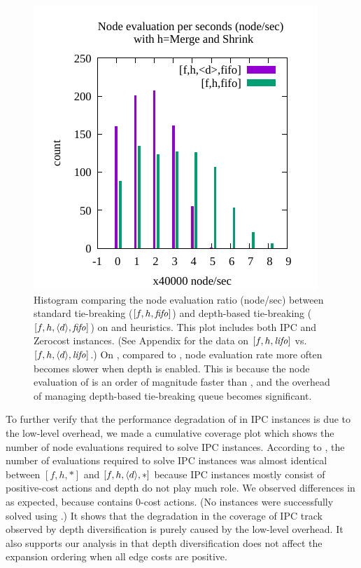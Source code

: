 \begin{figure}[htbp]
 \includegraphics{img/node-sec/mnhiF-mnh_F-hist.pdf}
 \caption{Histogram comparing the node evaluation ratio (node/sec) between standard tie-breaking ($[f,h,{\text{\textit{fifo}}}]$) and
 depth-based tie-breaking ($[f,h,{\left<d\right>},{\text{\textit{fifo}}}]$) on \lmcut and \mands heuristics.
 This plot includes both IPC and Zerocost instances.
 (See Appendix  for the data on $[f,h,{\text{\textit{lifo}}}]$ vs. $[f,h,{\left<d\right>},{\text{\textit{lifo}}}]$.)
 On \mands, compared to \lmcut, node evaluation rate more often becomes
 slower when depth is enabled. This is because the node evaluation of \mands is an order of
 magnitude faster than \lmcut, and the overhead of managing depth-based tie-breaking queue becomes significant.
 }
 \label{fig:expansion-ratio}
\end{figure}

To further verify that the performance degradation of \mands in IPC instances is due to the low-level overhead,
we made a cumulative coverage plot which shows the number of node evaluations
required to solve IPC instances.
% 
According to , the number of evaluations required to solve IPC instances
was almost identical between $[f,h,*]$ and $[f,h,{\left<d\right>},*]$
because IPC instances mostly consist of positive-cost actions and depth do not play much role.
We observed differences in  as expected, because  contains 0-cost actions.
(No  instances were successfully solved using \mands.)
It shows that the degradation in the coverage of IPC track observed by depth diversification is purely caused by the low-level overhead.
% 
It also supports our analysis in  that depth diversification
does not affect the expansion ordering when all edge costs are positive.

